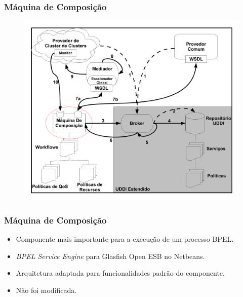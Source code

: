 \documentclass[red, cover=invisible, theme=Warsaw]{myslides}
\begin{document}
	\begin{frame} \frametitle{Máquina de Composição}
	    \begin{center}
		\begin{figure}
		\includegraphics[scale=0.25]{imagens/execComposicaoA-1.pdf}	    
		\end{figure}
	    \end{center}
	\end{frame}
	
	\begin{frame} \frametitle{Máquina de Composição}
	    \begin{itemize}
		\item Componente mais importante para a execução de um processo BPEL.
		\item \textit{BPEL Service Engine} para Glasfish Open ESB no Netbeans.
		\item Arquitetura adaptada para funcionalidades padrão do componente.
		\item Não foi modificada. 
	    \end{itemize}	
	\end{frame}
	
\end{document}
